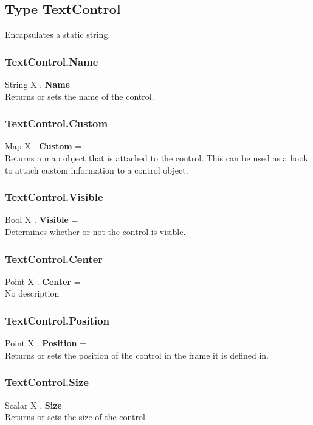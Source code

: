 \subsection{Type TextControl \label{T:TextControl}}
Encapsulates a static string.

\subsubsection{TextControl.Name \label{F:TextControl:Name}}
String X . \textbf{Name} = \\
Returns or sets the name of the control.

\subsubsection{TextControl.Custom \label{F:TextControl:Custom}}
Map X . \textbf{Custom} = \\
Returns a map object that is attached to the control. This can be used as a hook to attach custom information to a control object.

\subsubsection{TextControl.Visible \label{F:TextControl:Visible}}
Bool X . \textbf{Visible} = \\
Determines whether or not the control is visible.

\subsubsection{TextControl.Center \label{F:TextControl:Center}}
Point X . \textbf{Center} = \\
No description

\subsubsection{TextControl.Position \label{F:TextControl:Position}}
Point X . \textbf{Position} = \\
Returns or sets the position of the control in the frame it is defined in.

\subsubsection{TextControl.Size \label{F:TextControl:Size}}
Scalar X . \textbf{Size} = \\
Returns or sets the size of the control.

